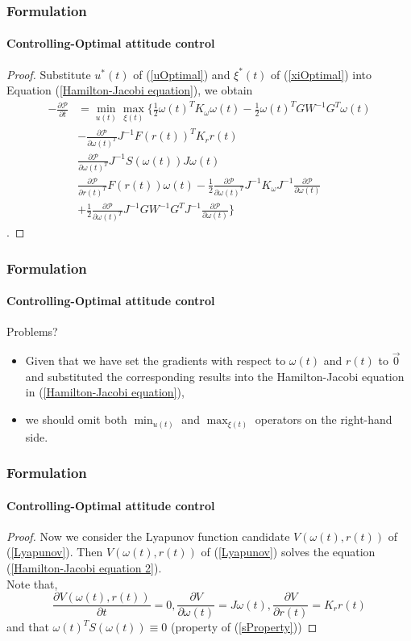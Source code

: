 \documentclass{beamer}
\begin{document}
\begin{frame}
\frametitle{Formulation}
\framesubtitle{Controlling-Optimal attitude control}
\begin{proof}
Substitute $u^{*}(t)$ of (\ref{uOptimal}) and $\xi^{*}(t)$ of (\ref{xiOptimal}) into Equation (\ref{Hamilton-Jacobi equation}), we obtain
\begin{equation}\label{Hamilton-Jacobi equation 2}
\begin{split}
-\frac{\partial \mathcal{P}}{\partial t}&=\min_{u(t)}\max_{\xi(t)}\biggl\{
\frac{1}{2}\omega(t)^{T}K_{\omega}\omega(t)-\frac{1}{2}\omega(t)^{T}GW^{-1}G^{T}\omega(t)\\
	&-\frac{\partial \mathcal{P}}{\partial \omega(t)^{T}}J^{-1}F(r(t))^{T}K_{r}r(t)\\
	&\frac{\partial \mathcal{P}}{\partial \omega(t)^{T}}J^{-1}S(\omega(t))J\omega(t)\\
	&\frac{\partial \mathcal{P}}{\partial r(t)^{T}}F(r(t))\omega(t)
	-\frac{1}{2}\frac{\partial \mathcal{P}}{\partial \omega(t)^{T}}J^{-1}K_{\omega}J^{-1}\frac{\partial \mathcal{P}}{\partial \omega(t)}\\
	&+\frac{1}{2}\frac{\partial \mathcal{P}}{\partial \omega(t)^{T}}J^{-1}GW^{-1}G^{T}J^{-1}\frac{\partial \mathcal{P}}{\partial \omega(t)}
	\biggr\}
\end{split}
\end{equation}
.
\end{proof}
\end{frame}

\begin{frame}
\frametitle{Formulation}
\framesubtitle{Controlling-Optimal attitude control}
Problems?
\begin{itemize}
	\item Given that we have set the gradients with respect to $\omega(t)$ and $r(t)$ to $\vec{0}$ and substituted the corresponding results into the Hamilton-Jacobi equation in (\ref{Hamilton-Jacobi equation}),
	\item we should omit both $\min_{u(t)}$ and $\max_{\xi(t)}$ operators on the right-hand side. 
\end{itemize}
\end{frame}

\begin{frame}
\frametitle{Formulation}
\framesubtitle{Controlling-Optimal attitude control}
\begin{proof}
	Now we consider the Lyapunov function candidate $V(\omega(t),r(t))$ of (\ref{Lyapunov}). Then $V(\omega(t),r(t))$ of (\ref{Lyapunov}) solves the equation (\ref{Hamilton-Jacobi equation 2}). \\
	Note that,
	\begin{equation}
	\frac{\partial V(\omega(t),r(t))}{\partial t}=0,\frac{\partial V}{\partial \omega(t)}=J\omega(t),\frac{\partial V}{\partial r(t)}=K_{r}r(t)
	\end{equation}
	and that $\omega(t)^{T}S(\omega(t))\equiv0$ (property of (\ref{sProperty}))
\end{proof}
\end{frame}
\end{document}
